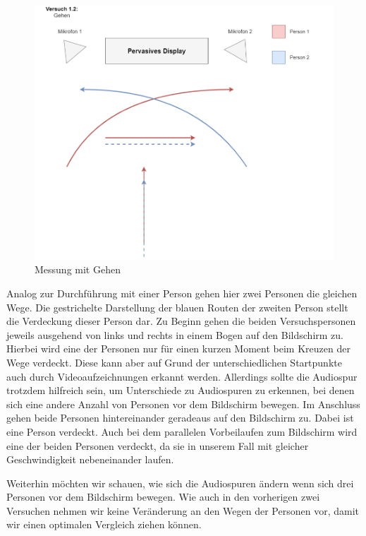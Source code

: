  
\begin{figure}[H]
	\begin{center}
		\includegraphics[width=\textwidth]{images/Versuch 1.2.PNG}
		\caption{Messung mit Gehen}
	\label{versuch1.2}
	\end{center}
\end{figure}

Analog zur Durchführung mit einer Person gehen hier zwei Personen die gleichen Wege. Die gestrichelte Darstellung der blauen Routen der zweiten Person stellt die Verdeckung dieser Person dar. Zu Beginn gehen die beiden Versuchspersonen jeweils ausgehend von links und rechts in einem Bogen auf den Bildschirm zu. Hierbei wird eine der Personen nur für einen kurzen Moment beim Kreuzen der Wege verdeckt. Diese kann aber auf Grund der unterschiedlichen Startpunkte auch durch Videoaufzeichnungen erkannt werden. Allerdings sollte die Audiospur trotzdem hilfreich sein, um Unterschiede zu Audiospuren zu erkennen, bei denen sich eine andere Anzahl von Personen vor dem Bildschirm bewegen. Im Anschluss gehen beide Personen hintereinander geradeaus auf den Bildschirm zu. Dabei ist eine Person verdeckt. Auch bei dem parallelen Vorbeilaufen zum Bildschirm wird eine der beiden Personen verdeckt, da sie in unserem Fall mit gleicher Geschwindigkeit nebeneinander laufen. 

Weiterhin möchten wir schauen, wie sich die Audiospuren ändern wenn sich drei Personen vor dem Bildschirm bewegen. Wie auch in den vorherigen zwei Versuchen nehmen wir keine Veränderung an den Wegen der Personen vor, damit wir einen optimalen Vergleich ziehen können. 

